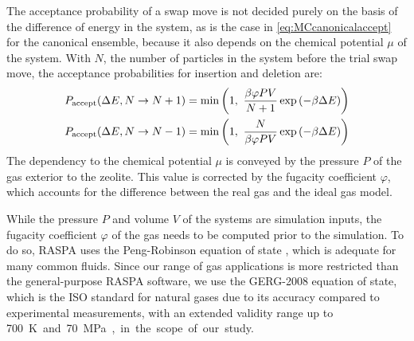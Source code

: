 \documentclass[main.tex]{subfiles}
\begin{document}
The acceptance probability of a swap move is not decided purely on the basis of the difference of energy in the system, as is the case in \cref{eq:MCcanonicalaccept} for the canonical ensemble, because it also depends on the chemical potential $\mu$ of the system. With $N$, the number of particles in the system before the trial swap move, the acceptance probabilities for insertion and deletion are:
\[\begin{split}
	P_\text{accept}(\Delta E, N\to N+1) &= \min\paren{1,\ \frac{\beta\varphi P V}{N+1}\exp\paren{-\beta\Delta E}}\\
	P_\text{accept}(\Delta E, N\to N-1) &= \min\paren{1,\ \frac{N}{\beta\varphi P V}\exp\paren{-\beta\Delta E}}
\end{split}\]
The dependency to the chemical potential $\mu$ is conveyed by the pressure $P$ of the gas exterior to the zeolite. This value is corrected by the fugacity coefficient $\varphi$, which accounts for the difference between the real gas and the ideal gas model.

While the pressure $P$ and volume $V$ of the systems are simulation inputs, the fugacity coefficient $\varphi$ of the gas needs to be computed prior to the simulation. To do so, RASPA uses the Peng-Robinson equation of state \autocite{PengRobinson}, which is adequate for many common fluids. Since our range of gas applications is more restricted than the general-purpose RASPA software, we use the GERG-2008 \autocite{GERG2008} equation of state, which is the ISO standard for natural gases due to its accuracy compared to experimental measurements, with an extended validity range up to \qty{700}K and \qty{70}{MPa}, in the scope of our study.
\end{document}
